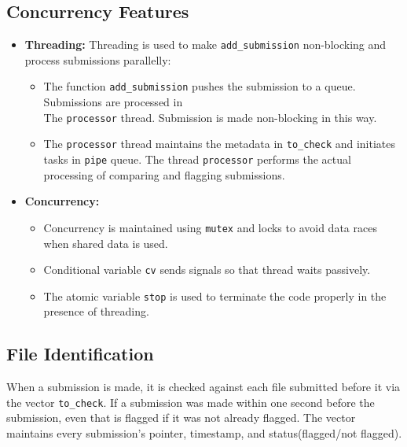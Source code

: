 \documentclass[11pt]{article}
\let\oldtexttt\texttt
\def\texttt#1{{\color{RoyalBlue}\oldtexttt{#1}}}
\begin{document}
\subsection{Concurrency Features}
\begin{itemize}[noitemsep]
    \item \textbf{Threading:} Threading is used to make \texttt{add\_submission} non-blocking and process submissions parallelly:
    \begin{itemize}
        \item The function \texttt{add\_submission} pushes the submission to a queue. Submissions are processed in \\ The \texttt{processor} thread. Submission is made non-blocking in this way.
        \item The \texttt{processor} thread maintains the metadata in \texttt{to\_check} and initiates tasks in \texttt{pipe} queue. The thread \texttt{processor} performs the actual processing of comparing and flagging submissions.
    \end{itemize}
    \item \textbf{Concurrency:} 
    \begin{itemize}
        \item Concurrency is maintained using \texttt{mutex} and locks to avoid data races when shared data is used.
        \item Conditional variable \texttt{cv} sends signals so that thread waits passively.
        \item  The atomic variable \texttt{stop} is used to terminate the code properly in the presence of threading.
    \end{itemize} 
\end{itemize}
\vspace{-5pt}
\subsection{File Identification}
When a submission is made, it is checked against each file submitted before it via the vector \texttt{to\_check}. If a submission was made within one second before the submission, even that is flagged if it was not already flagged. The vector maintains every submission's pointer, timestamp, and status(flagged/not flagged).
\vspace{-5pt}
\end{document}
